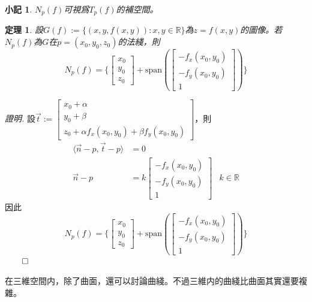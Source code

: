 \documentclass[12pt]{article}
\newcommand{\innerprod}[2]{\langle{#1},{#2}\rangle}
\newtheorem*{theorem}{定理}
\newtheorem*{remark}{小記}
\renewenvironment*{proof}{\textit{證明.}}{\hfill$\qed$}
\begin{document}
    \begin{remark}
        $N_p(f)$可視爲$T_p(f)$的補空間。
    \end{remark}

    \begin{theorem}
        設$G(f):=\{(x,y,f(x,y)):x,y\in\mathbb{R}\}$為$z=f(x,y)$的圖像。若$N_p(f)$為$G$在$p=(x_0,y_0,z_0)$的法綫，則$$N_p(f)=\{\begin{bmatrix}
            x_0\\y_0\\z_0
        \end{bmatrix}+\mathrm{span}(\begin{bmatrix}
            -f_x(x_0,y_0)\\
            -f_y(x_0,y_0)\\
            1
        \end{bmatrix})\}$$
    \end{theorem}
    
    \begin{proof}
        設$\vec{t}:=\begin{bmatrix}
            x_0+\alpha\\y_0+\beta\\z_0+\alpha f_x(x_0,y_0)+\beta f_y(x_0,y_0)
        \end{bmatrix}$，則\begin{align*}
            \innerprod{\vec{n}-p}{\vec{t}-p}&=0\\
            \vec{n}-p&=k\begin{bmatrix}
                -f_x(x_0,y_0)\\
                -f_y(x_0,y_0)\\
                1
            \end{bmatrix}&k\in\mathbb{R}
        \end{align*}
        因此$$N_p(f)=\{\begin{bmatrix}
            x_0\\y_0\\z_0
        \end{bmatrix}+\mathrm{span}(\begin{bmatrix}
            -f_x(x_0,y_0)\\
            -f_y(x_0,y_0)\\
            1
        \end{bmatrix})\}$$
    \end{proof}

    在三維空間内，除了曲面，還可以討論曲綫。不過三維内的曲綫比曲面其實還要複雜。
\end{document}
